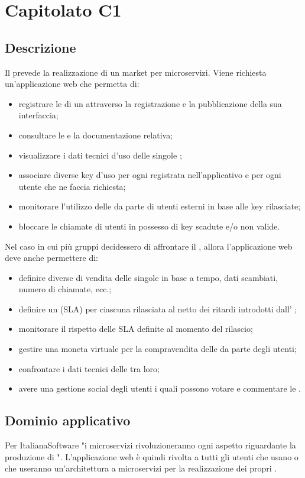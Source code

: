 \section {Capitolato C1}
	\subsection {Descrizione}
		Il  prevede la realizzazione di un  market per microservizi. Viene richiesta un'applicazione web che permetta di:
		\begin {itemize}
			\item registrare le  di un  attraverso la registrazione e la pubblicazione della sua interfaccia;
			\item consultare le  e la documentazione relativa;
			\item visualizzare i dati tecnici d'uso delle singole ;
			\item associare diverse  key d'uso per ogni  registrata nell'applicativo e per ogni utente che ne faccia richiesta;
			\item monitorare l'utilizzo delle  da parte di utenti esterni in base alle  key rilasciate;
			\item bloccare le chiamate di utenti in possesso di  key scadute e/o non valide.
		\end {itemize}
		Nel caso in cui più gruppi decidessero di affrontare il , allora l'applicazione web deve anche permettere di:
		\begin {itemize}
			\item definire diverse  di vendita delle singole  in base a tempo, dati scambiati, numero di chiamate, ecc.;
			\item definire un  (SLA) per ciascuna  rilasciata al netto dei ritardi introdotti dall' ;
			\item monitorare il rispetto delle SLA definite al momento del rilascio;
			\item gestire una moneta virtuale per la compravendita delle  da parte degli utenti;
			\item confrontare i dati tecnici delle  tra loro;
			\item avere una gestione social degli utenti i quali possono votare e commentare le .
		\end {itemize}
	\subsection {Dominio applicativo} 
		Per ItalianaSoftware "i microservizi rivoluzioneranno ogni aspetto riguardante la produzione di ". L'applicazione web è quindi rivolta a tutti gli utenti che usano o che useranno 
		un'architettura a microservizi per la realizzazione dei propri .

